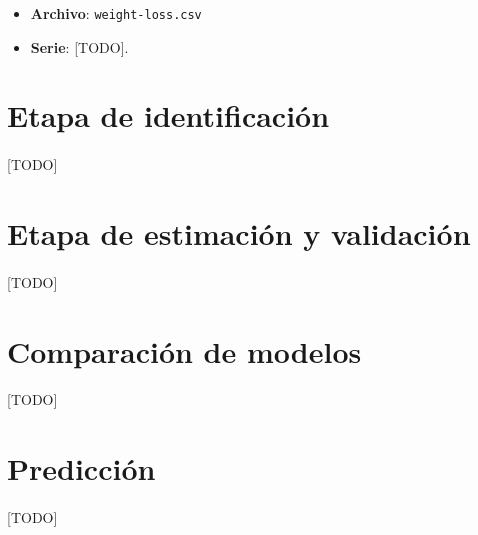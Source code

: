 \documentclass[a4paper, spanish]{article}
\begin{document}
  \maketitle

  \begin{itemize}
    \item \textbf{Archivo}: \texttt{weight-loss.csv}
    \item \textbf{Serie}: [TODO].
  \end{itemize}

  \section{Etapa de identificación}

    \paragraph{}
    [TODO]

  \section{Etapa de estimación y validación}

    \paragraph{}
    [TODO]

  \section{Comparación de modelos}

    \paragraph{}
    [TODO]

  \section{Predicción}

    \paragraph{}
    [TODO]
\end{document}
